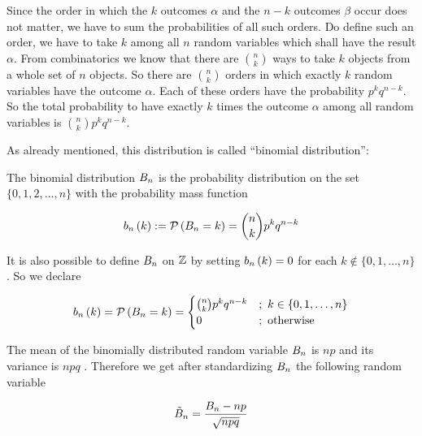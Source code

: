 Since the order in which the $k$ outcomes $\alpha$ and the $n-k$ outcomes $\beta$ occur does not matter, we have to sum the probabilities of all such orders. Do define such an order, we have to take $k$ among all $n$ random variables which shall have the result $\alpha$. From combinatorics we know that there are $\binom nk$ ways to take $k$ objects from a whole set of $n$ objects. So there are $\binom nk$ orders in which exactly $k$ random variables have the outcome $\alpha$. Each of these orders have the probability $p^kq^{n-k}$. So the total probability to have exactly $k$ times the outcome $\alpha$ among all random variables is $\binom nk p^kq^{n-k}$.

As already mentioned, this distribution is called ``binomial distribution'':

\begin{definition}
  The binomial distribution $\Bs$ is the probability distribution on the set $\{0,1,2,\ldots,n\}$ with the probability mass function

  \begin{align}
      \b{k}:=\P{\Bs=k} = \binom nk p^k q^{n-k}
  \end{align}
\end{definition}

It is also possible to define $\Bs$ on $\Z$ by setting $\b{k}=0$ for each $k\notin \{0,1,\ldots,n\}$. So we declare

\begin{align}
\b[n]{k} = \P{\Bs[n] = k} = \begin{cases} \binom nk p^k q^{n-k} & ;\ k \in \{0,1,\ldots,n\} \\ 0 & ;\  \text{otherwise} \end{cases}
\end{align}


The mean of the binomially distributed random variable $\Bs[n]$ is $np$ and its variance is $npq$ \cite[p. 112]{georgii}\cite[pp. 8-9]{fels}\cite{wiki:binomial_distribution}. Therefore we get after standardizing $\Bs[n]$ the following random variable

\begin{align}
  \BBs[n] = \frac{\Bs[n]-np}{\sqrt{npq}}
\end{align}

